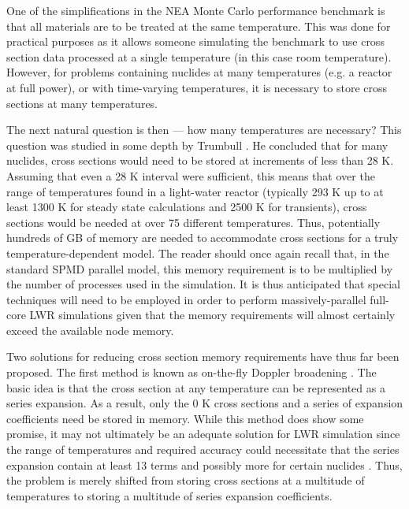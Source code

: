 One of the simplifications in the NEA Monte Carlo performance benchmark is that
all materials are to be treated at the same temperature. This was done for
practical purposes as it allows someone simulating the benchmark to use cross
section data processed at a single temperature (in this case room
temperature). However, for problems containing nuclides at many temperatures
(e.g. a reactor at full power), or with time-varying temperatures, it is
necessary to store cross sections at many temperatures.

The next natural question is then --- how many temperatures are necessary? This
question was studied in some depth by Trumbull \cite{nt-trumbull-2006}. He
concluded that for many nuclides, cross sections would need to be stored at
increments of less than 28 K. Assuming that even a 28 K interval were
sufficient, this means that over the range of temperatures found in a
light-water reactor (typically 293 K up to at least 1300 K for steady state
calculations and 2500 K for transients), cross sections would be needed at over
75 different temperatures. Thus, potentially hundreds of GB of memory are needed
to accommodate cross sections for a truly temperature-dependent model. The
reader should once again recall that, in the standard SPMD parallel model, this
memory requirement is to be multiplied by the number of processes used in the
simulation. It is thus anticipated that special techniques will need to be
employed in order to perform massively-parallel full-core LWR simulations given
that the memory requirements will almost certainly exceed the available node
memory.

Two solutions for reducing cross section memory requirements have thus far been
proposed. The first method is known as on-the-fly Doppler broadening
\cite{nse-yesilyurt-2012, trans-brown-2012}. The basic idea is that the cross
section at any temperature can be represented as a series expansion. As a
result, only the 0 K cross sections and a series of expansion coefficients need
be stored in memory. While this method does show some promise, it may not
ultimately be an adequate solution for LWR simulation since the range of
temperatures and required accuracy could necessitate that the series expansion
contain at least 13 terms and possibly more for certain nuclides
\cite{net-martin-2012}. Thus, the problem is merely shifted from storing cross
sections at a multitude of temperatures to storing a multitude of series
expansion coefficients.

